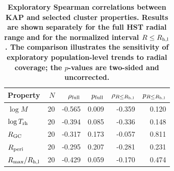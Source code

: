 \begin{table}
\centering
\caption{\textbf{Exploratory Spearman correlations between KAP and selected cluster properties. Results are shown separately for the full HST radial range and for the normalized interval $R\leq R_{\rm h,l}$. The comparison illustrates the sensitivity of exploratory population-level trends to radial coverage; the $p$-values are two-sided and uncorrected.}}
\label{tab:kap_correlations}
\small
\setlength{\tabcolsep}{4pt}
\begin{tabular}{lrrrrr}
\hline
Property & $N$ & $\rho_{\rm full}$ & $p_{\rm full}$ & $\rho_{R\leq R_{\rm h,l}}$ & $p_{R\leq R_{\rm h,l}}$ \\
\hline
$\log M$ & 20 & -0.565 & 0.009 & -0.359 & 0.120 \\
$\log T_{\rm rh}$ & 20 & -0.394 & 0.085 & -0.336 & 0.148 \\
$R_{\rm GC}$ & 20 & -0.317 & 0.173 & -0.057 & 0.811 \\
$R_{\rm peri}$ & 20 & -0.295 & 0.207 & -0.281 & 0.231 \\
$R_{\max}/R_{\rm h,l}$ & 20 & -0.429 & 0.059 & -0.170 & 0.474 \\
\hline
\end{tabular}
\end{table}
